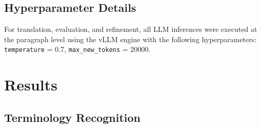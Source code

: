 \documentclass[11pt]{article}
\begin{document}




\subsection{Hyperparameter Details}
For translation, evaluation, and refinement, all LLM inferences were executed at the paragraph level using the vLLM engine with the following hyperparameters: \texttt{temperature} = 0.7, \texttt{max\_new\_tokens} = 20000.



\section{Results}

\subsection{Terminology Recognition}
\end{document}
